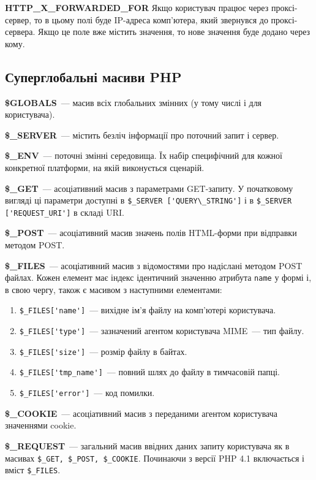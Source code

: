 \textbf{HTTP\_X\_FORWARDED\_FOR} Якщо користувач працює через проксі-сервер, то в цьому полі буде IP-адреса комп'ютера, який звернувся до проксі-сервера. Якщо це поле вже містить значення, то нове значення буде додано через кому.



\subsection{Суперглобальні масиви PHP}
\label{sup-glob:app}

\textbf{\$GLOBALS}~--- масив всіх глобальних змінних (у тому числі і для користувача).

\textbf{\$\_SERVER}~--- містить безліч інформації про поточний запит і сервер.

\textbf{\$\_ENV}~--- поточні змінні середовища. Їх набір специфічний для кожної конкретної платформи, на якій виконується сценарій.

\textbf{\$\_GET}~--- асоціативний масив з параметрами GET-запиту. У початковому вигляді ці параметри доступні в \verb|$_SERVER ['QUERY\_STRING']| і в \verb|$_SERVER ['REQUEST_URI']| в складі URI.

\textbf{\$\_POST}~--- асоціативний масив значень полів HTML-форми при відправки методом POST.

\textbf{\$\_FILES}~--- асоціативний масив з відомостями про надіслані методом POST файлах. Кожен елемент має індекс ідентичний значенню атрибута \verb'name' у формі і, в свою чергу, також є масивом з наступними елементами:
\begin{enumerate}
\item \verb|$_FILES['name']|~--- вихідне ім'я файлу на комп'ютері користувача.
\item \verb|$_FILES['type']|~--- зазначений агентом користувача MIME~--- тип файлу.
\item \verb|$_FILES['size']|~--- розмір файлу в байтах.
\item \verb|$_FILES['tmp_name']|~--- повний шлях до файлу в тимчасовій папці.
\item \verb|$_FILES['error']|~--- код помилки.
\end{enumerate}

\textbf{\$\_COOKIE}~--- асоціативний масив з переданими агентом користувача значеннями cookie.

\textbf{\$\_REQUEST}~--- загальний масив ввідних даних запиту користувача як в масивах \verb'$_GET, $_POST, $_COOKIE'. Починаючи з версії PHP 4.1 включається і вміст \verb'$_FILES'.


